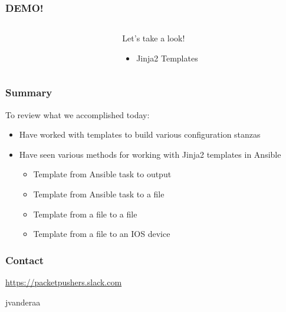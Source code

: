 \documentclass[aspectratio=169]{beamer}
\begin{document}
  \begin{frame}
    \frametitle{DEMO!}
    \begin{columns}
    \begin{column}{0.3\textwidth}
      \Huge
      \begin{center}
        \faDesktop 
        \hspace{.5cm}
        \faRocket     
      \end{center}
    \end{column}
    \begin{column}{0.7\textwidth}
      \huge 
        Let's take a look!
        \begin{itemize}
          \item Jinja2 Templates
        \end{itemize}
    \end{column}
    \end{columns}
  \end{frame}

  \begin{frame}
    \frametitle{Summary}
      To review what we accomplished today:
      \begin{itemize}
        \item <2-> Have worked with templates to build various configuration stanzas
        \item <3-> Have seen various methods for working with Jinja2 templates in Ansible
        \begin{itemize}
            \item <3-> Template from Ansible task to output
            \item <4-> Template from Ansible task to a file
            \item <5-> Template from a file to a file
            \item <6-> Template from a file to an IOS device
        \end{itemize}
      \end{itemize}
  \end{frame}

  \begin{frame}
    \frametitle{Contact}
    \huge
    \begin{center}
      \url{https://packetpushers.slack.com}
    \end{center}
    \begin{center}
      \normalsize
      \faSlack \hspace{.1cm}jvanderaa  
    \end{center}
  \end{frame}
\end{document}
